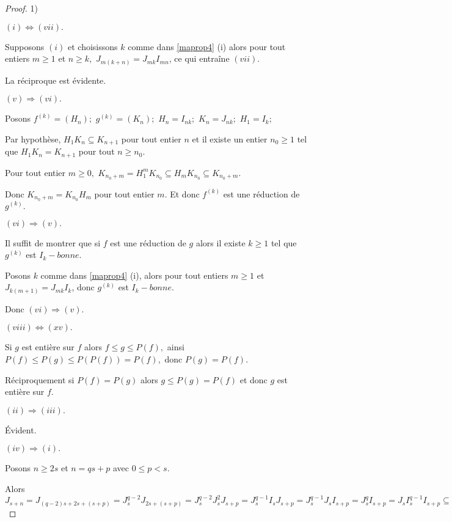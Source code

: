 \begin{proof}
	
	1)
	
	$(i)\Longleftrightarrow (vii).$
	
	Supposons $(i)$ et choisissons $k$ comme dans \ref{maprop4} (i) alors pour tout
	entiers $m\geq 1$ et $n\geq k,$ $J_{m(k+n)}=J_{mk}I_{mn}$, ce qui entraîne $(vii).$
	
	La réciproque est évidente.
	
	$(v)\Longrightarrow (vi).$
	
	Posons $f^{(k)}=(H_{n});$ $g^{(k)}=(K_{n});$ $H_{n}=I_{nk};$ $K_{n}=J_{nk};$ 
	$H_{1}=I_{k};$
	
	Par hypothèse, $H_{1}K_{n}\subseteq K_{n+1}$ pour tout entier $n$ et il
	existe un entier $n_{0}\geq 1$ tel que $H_{1}K_{n}=K_{n+1}$ pour tout $n\geq
	n_{0}.$
	
	Pour tout entier $m\geq 0,$ $K_{n_{0}+m}=H_{1}^{m}K_{n_{0}}\subseteq
	H_{m}K_{n_{0}}\subseteq K_{n_{0}+m}.$
	
	Donc $K_{n_{0}+m}=K_{n_{0}}H_{m}$ pour tout entier $m.$ Et donc $f^{(k)}$
	est une réduction de $g^{(k)}.$
	
	$(vi)\Longrightarrow (v).$
	
	Il suffit de montrer que si $f$ est une réduction de $g$ alors il existe 
	$k\geq 1$ tel que $g^{(k)}$ est $I_{k}-bonne.$
	
	Posons $k$ comme dans \ref{maprop4} (i), alors pour tout entiers $m\geq 1$ et  $J_{k(m+1)}=J_{mk}I_{k}$, donc $g^{(k)}$ est $I_{k}-bonne.$
	
	Donc $(vi)\Longrightarrow (v).$
	
	$(viii)\Longleftrightarrow (xv).$
	
	Si $g$ est entière sur $f$ alors $f\leq g\leq P(f),$ ainsi $P(f)\leq
	P(g)\leq P(P(f))=P(f),$ donc $P(g)=P(f).$
	
	Réciproquement si $P(f)=P(g)$ alors $g\leq P(g)=P(f)$ et donc $g$ est entière sur $f.$
	
	$(ii)\Longrightarrow (iii).$
	
	Évident.
	
	$(iv)\Longrightarrow (i).$
	
	Posons $n\geq 2s$ et $n=qs+p$ avec $0\leq p<s.$
	
	Alors $J_{s+n}=J_{(q-2)s+2s+(s+p)}=J_{s}^{q-2}J_{2s+(s+p)}=J_{s}^{q-2}J_{s}^{2}J_{s+p}=J_{s}^{q-1}I_{s}J_{s+p}=J_{s}^{q-1}J_{s}I_{s+p}=J_{s}^{q}I_{s+p}=J_{s}I_{s}^{q-1}I_{s+p}\subseteq J_{s}I_{n}\subseteq J_{s+n}.
	$
	

\end{proof}
